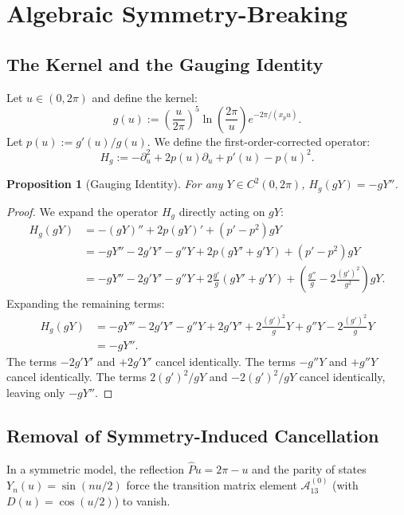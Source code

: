 \documentclass[11pt,a4paper]{article}
\newtheorem{proposition}{Proposition}
\begin{document}
\section{Algebraic Symmetry-Breaking}
\label{sec:algebraic}

\subsection{The Kernel and the Gauging Identity}
Let \(u \in (0, 2\pi)\) and define the kernel:
\begin{equation}
\label{eq:g}
g(u) := \left(\frac{u}{2\pi}\right)^{5} \ln\!\left(\frac{2\pi}{u}\right) e^{-2\pi/(x_p u)}.
\end{equation}
Let \(p(u) := g'(u)/g(u)\). We define the first-order-corrected operator:
\begin{equation}
H_g := -\partial_u^2 + 2p(u)\partial_u + p'(u) - p(u)^2.
\end{equation}

\begin{proposition}[Gauging Identity]
For any \(Y \in C^2(0, 2\pi)\), \(H_g(gY) = -gY''\).
\end{proposition}
\begin{proof}
We expand the operator \(H_g\) directly acting on \(gY\):
\begin{align*}
H_g(gY) &= -(gY)'' + 2p(gY)' + (p'-p^2)gY \\
&= -gY'' - 2g'Y' - g''Y + 2p(gY' + g'Y) + (p'-p^2)gY \\
&= -gY'' - 2g'Y' - g''Y + 2\frac{g'}{g}(gY' + g'Y) + \left(\frac{g''}{g} - 2\frac{(g')^2}{g^2}\right)gY.
\end{align*}
Expanding the remaining terms:
\begin{align*}
H_g(gY) &= -gY'' - 2g'Y' - g''Y + 2g'Y' + 2\frac{(g')^2}{g}Y + g''Y - 2\frac{(g')^2}{g}Y \\
&= -gY''.
\end{align*}
The terms \(-2g'Y'\) and \(+2g'Y'\) cancel identically. The terms \(-g''Y\) and \(+g''Y\) cancel identically. The terms \(2(g')^2/g Y\) and \(-2(g')^2/g Y\) cancel identically, leaving only \(-gY''\).
\end{proof}

\subsection{Removal of Symmetry-Induced Cancellation}
In a symmetric model, the reflection \(\hat{P}u = 2\pi-u\) and the parity of states \(Y_n(u) = \sin(nu/2)\) force the transition matrix element \(\mathcal{A}_{13}^{(0)}\) (with \(D(u)=\cos(u/2)\)) to vanish.
\end{document}
